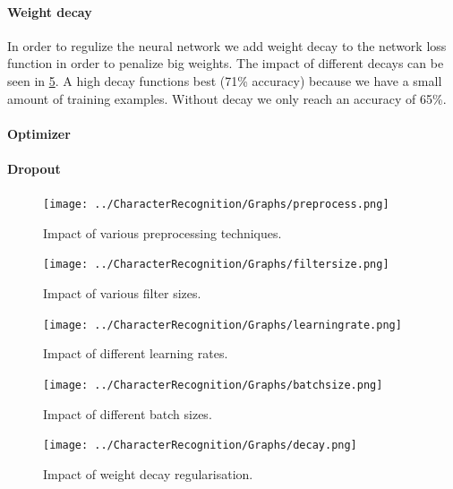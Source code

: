 \documentclass{article}
\begin{document}
\paragraph{Weight decay}
In order to regulize the neural network we add weight decay to the network loss function in order to penalize big weights. The impact of different decays can be seen in \ref{fig:decay}. A high decay functions best (71\% accuracy) because we have a small amount of training examples. Without decay we only reach an accuracy of 65\%. 
\paragraph{Optimizer}
\paragraph{Dropout}
\begin{figure}
\centering
    \texttt{[image: ../CharacterRecognition/Graphs/preprocess.png]}
    \caption{Impact of various preprocessing techniques.}
    \label{fig:preprocess}
\end{figure}
\begin{figure}
    \centering
    \texttt{[image: ../CharacterRecognition/Graphs/filtersize.png]}
    \caption{Impact of various filter sizes.}
    \label{fig:filtersize}
\end{figure}
\begin{figure}
    \centering
    \texttt{[image: ../CharacterRecognition/Graphs/learningrate.png]}
    \caption{Impact of different learning rates.}
    \label{fig:learningrate}
\end{figure}
\begin{figure}
    \centering
    \texttt{[image: ../CharacterRecognition/Graphs/batchsize.png]}
    \caption{Impact of different batch sizes.}
    \label{fig:batchsize}
\end{figure}
\begin{figure}
    \centering
    \texttt{[image: ../CharacterRecognition/Graphs/decay.png]}
    \caption{Impact of weight decay regularisation.}
    \label{fig:decay}
\end{figure}
\end{document}
